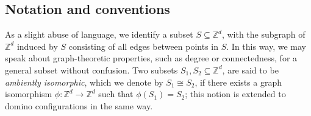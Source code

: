 \subsection{Notation and conventions}

As a slight abuse of language, we identify a subset $S \subseteq \mathbb{Z}^d$, with the subgraph of $\mathbb{Z}^d$ induced by $S$ consisting of all edges between points in $S$.
In this way, we may speak about graph-theoretic properties, such as degree or connectedness, for a general subset without confusion.
Two subsets $S_1, S_2 \subseteq \mathbb{Z}^d$, are said to be \emph{ambiently isomorphic}, which we denote by $S_1 \cong S_2$, if there exists a graph isomorphism $\phi \colon \mathbb{Z}^d \to \mathbb{Z}^d$ such that $\phi(S_1) = S_2$; this notion is extended to domino configurations in the same way.
